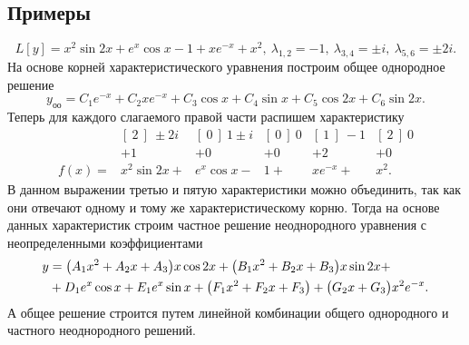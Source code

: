     \subsection{Примеры}

        \[
            L[y] = x^2 \sin{2x} + e^x \cos{x} - 1 + xe^{-x} + x^2, ~ \lambda_{1, 2} = -1, ~ \lambda_{3, 4} = \pm i, ~ \lambda_{5, 6} = \pm 2i.
        \]
        На основе корней характеристического уравнения построим общее однородное решение
        \[
            y_\text{оо} = C_1 e^{-x} + C_2 xe^{-x} + C_3 \cos{x} + C_4 \sin{x} + C_5 \cos{2x} + C_6 \sin{2x}.
        \]
        Теперь для каждого слагаемого правой части распишем характеристику
        \[
            \begin{matrix}
                &[ ~ 2 ~ ] ~ \pm 2i &[ ~ 0 ~ ] ~ 1 \pm i &[ ~ 0 ~ ] ~ 0 &[ ~ 1 ~ ] ~ -1 &[ ~ 2 ~ ] ~ 0 \\
                &+1 &+0 &+0 &+2 &+0 \\
                f(x) = &x^2 \sin{2x} + &e^x \cos{x} - &1 + &xe^{-x} + &x^2.
            \end{matrix}
        \]
        В данном выражении третью и пятую характеристики можно объединить, так как они отвечают одному и тому же характеристическому корню. Тогда на основе данных характеристик строим частное решение неоднородного уравнения с неопределенными коэффициентами
        \[
            \begin{split}
                y &= \bigl( A_1 x^2 + A_2 x + A_3 \bigr) x \cos{2x} + \bigl( B_1 x^2 + B_2 x + B_3 \bigr) x \sin{2x} + \\ &+ D_1 e^x \cos{x} + E_1 e^x \sin{x} + \bigl( F_1 x^2 + F_2 x + F_3 \bigr) + \bigl( G_2 x + G_3 \bigr) x^2 e^{-x}.
            \end{split}
        \]
        А общее решение строится путем линейной комбинации общего однородного и частного неоднородного решений.

